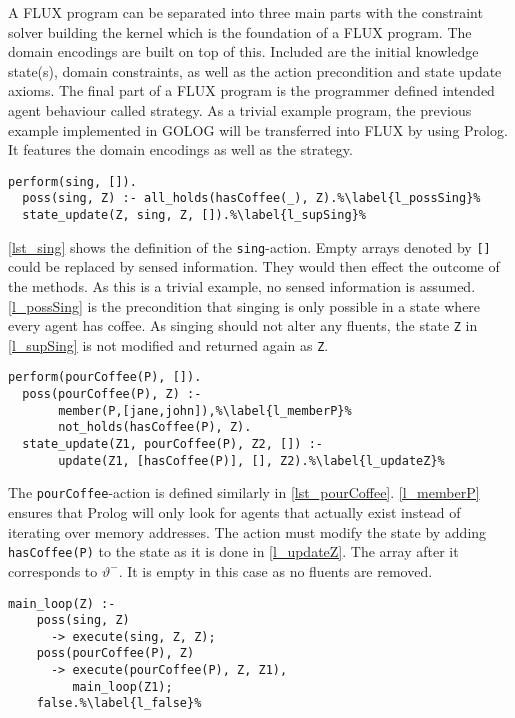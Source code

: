 A FLUX program can be separated into three main parts with the constraint solver building the kernel which is the foundation of a FLUX program. The domain encodings are built on top of this. Included are the initial knowledge state(s), domain constraints, as well as the action precondition and state update axioms. The final part of a FLUX program is the programmer defined intended agent behaviour called strategy. As a trivial example program, the previous example implemented in GOLOG will be transferred into FLUX by using Prolog.
It features the domain encodings as well as the strategy.
\begin{lstlisting}[caption={Defintion of the \texttt{sing}-action.}, label=lst_sing]
  perform(sing, []).
  poss(sing, Z) :- all_holds(hasCoffee(_), Z).%\label{l_possSing}%
  state_update(Z, sing, Z, []).%\label{l_supSing}%
\end{lstlisting}
\autoref{lst_sing} shows the definition of the \texttt{sing}-action. Empty arrays denoted by \texttt{[]} could be replaced by sensed information. They would then effect the outcome of the methods. As this is a trivial example, no sensed information is assumed. \autoref{l_possSing} is the precondition that singing is only possible in a state where every agent has coffee. As singing should not alter any fluents, the state \texttt{Z} in \autoref{l_supSing} is not modified and returned again as \texttt{Z}.
\begin{lstlisting}[firstnumber=4, caption={Definition of the \texttt{pourCoffee}-action}, label=lst_pourCoffee]
  perform(pourCoffee(P), []).
  poss(pourCoffee(P), Z) :-
       member(P,[jane,john]),%\label{l_memberP}%
       not_holds(hasCoffee(P), Z).
  state_update(Z1, pourCoffee(P), Z2, []) :-
       update(Z1, [hasCoffee(P)], [], Z2).%\label{l_updateZ}%
\end{lstlisting}
The \texttt{pourCoffee}-action is defined similarly in \autoref{lst_pourCoffee}. \autoref{l_memberP} ensures that Prolog will only look for agents that actually exist instead of iterating over memory addresses. The action must modify the state by adding \texttt{hasCoffee(P)} to the state as it is done in \autoref{l_updateZ}. The array after it corresponds to $\vartheta^-$. It is empty in this case as no fluents are removed.
\begin{lstlisting}[firstnumber=10, caption={Main method which either tells the robot to sing or to pour coffee.}, label=lst_main]
  main_loop(Z) :-
    poss(sing, Z)
      -> execute(sing, Z, Z);
    poss(pourCoffee(P), Z)
      -> execute(pourCoffee(P), Z, Z1),
         main_loop(Z1);
    false.%\label{l_false}%
\end{lstlisting}

